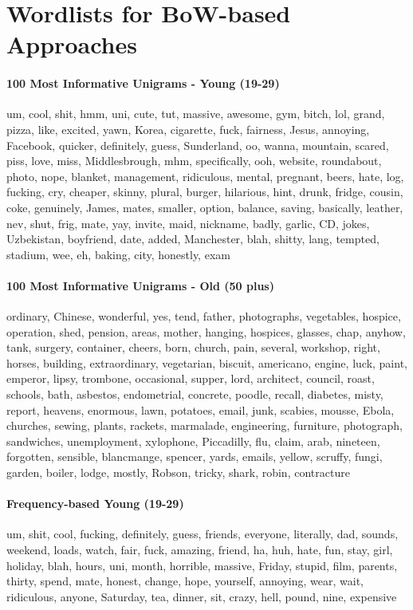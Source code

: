 \section{Wordlists for BoW-based Approaches}
\label{sec:wordlists}


\paragraph{100 Most Informative Unigrams - Young (19-29)} um, cool, shit, hmm, uni, cute, tut, massive, awesome, gym, bitch, lol, grand, pizza, like, excited, yawn, Korea, cigarette, fuck, fairness, Jesus, annoying, Facebook, quicker, definitely, guess, Sunderland, oo, wanna, mountain, scared, piss, love, miss, Middlesbrough, mhm, specifically, ooh, website, roundabout, photo, nope, blanket, management, ridiculous, mental, pregnant, beers, hate, log, fucking, cry, cheaper, skinny, plural, burger, hilarious, hint, drunk, fridge, cousin, coke, genuinely, James, mates, smaller, option, balance, saving, basically, leather, nev, shut, frig, mate, yay, invite, maid, nickname, badly, garlic, CD, jokes, Uzbekistan, boyfriend, date, added, Manchester, blah, shitty, lang, tempted, stadium, wee, eh, baking, city, honestly, exam

\paragraph{100 Most Informative Unigrams - Old (50 plus)} ordinary, Chinese, wonderful, yes, tend, father, photographs, vegetables, hospice, operation, shed, pension, areas, mother, hanging, hospices, glasses, chap, anyhow, tank, surgery, container, cheers, born, church, pain, several, workshop, right, horses, building, extraordinary, vegetarian, biscuit, americano, engine, luck, paint, emperor, lipsy, trombone, occasional, supper, lord, architect, council, roast, schools, bath, asbestos, endometrial, concrete, poodle, recall, diabetes, misty, report, heavens, enormous, lawn, potatoes, email, junk, scabies, mousse, Ebola, churches, sewing, plants, rackets, marmalade, engineering, furniture, photograph, sandwiches, unemployment, xylophone, Piccadilly, flu, claim, arab, nineteen, forgotten, sensible, blancmange, spencer, yards, emails, yellow, scruffy, fungi, garden, boiler, lodge, mostly, Robson, tricky, shark, robin, contracture

\paragraph{Frequency-based Young (19-29)} um,
shit, cool, fucking, definitely, guess, friends, everyone, literally, dad, sounds, weekend, loads, watch, fair, fuck, amazing, friend, ha, huh, hate, fun, stay, girl, holiday, blah, hours, uni, month, horrible, massive, Friday, stupid, film, parents, thirty, spend, mate, honest, change, hope, yourself, annoying, wear, wait, ridiculous, anyone, Saturday, tea, dinner, sit, crazy, hell, pound, nine, expensive

